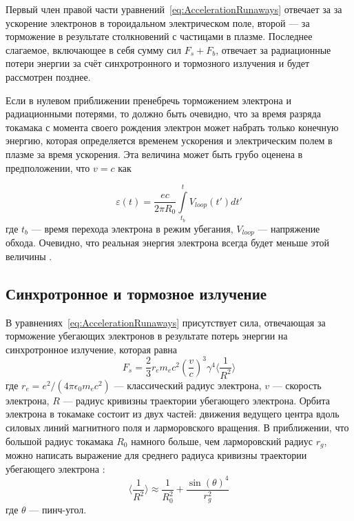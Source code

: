 Первый член правой части уравнений~\ref{eq:AccelerationRunaways} отвечает за за ускорение электронов в тороидальном электрическом поле, второй --- за торможение в результате столкновений с частицами в плазме. Последнее слагаемое, включающее в себя сумму сил $F_s + F_b$, отвечает за радиационные потери энергии за счёт синхротронного и тормозного излучения и будет рассмотрен позднее.

Если в нулевом приближении пренебречь торможением электрона и радиационными потерями, то должно быть очевидно, что за время разряда токамака с момента своего рождения электрон может набрать только конечную энергию, которая определяется временем ускорения и электрическим полем в плазме за время ускорения. Эта величина может быть грубо оценена в предположении, что $v = c$ как

\begin{equation*}
  \varepsilon(t) = \frac{ e c }{ 2 \pi R_0 } \int \limits_{t_b}^{t} V_{loop}(t') d t'
\end{equation*}
где $t_b$ --- время перехода электрона в режим убегания, $V_{loop}$ --- напряжение обхода. Очевидно, что реальная энергия электрона всегда будет меньше этой величины \cite{Shevelev2019th}.


\subsection{Синхротронное и тормозное излучение}

В уравнениях~\ref{eq:AccelerationRunaways} присутствует сила, отвечающая за торможение убегающих электронов в результате потерь энергии на синхротронное излучение, которая равна \cite{MartinSolis1998, MartinSolis1999} 
\begin{equation*}
  F_s = \frac{2}{3} r_e m_e c^2 \left( \frac{v}{c} \right)^3 \gamma^4 \langle \frac{1}{R^2} \rangle
\end{equation*}
где $r_e = e^2/(4 \pi \epsilon_0 m_e c^2 )$ --- классический радиус электрона, $v$ --- скорость электрона, $R$ --- радиус кривизны траектории убегающего электрона. Орбита электрона в токамаке 
состоит из двух частей: движения ведущего центра вдоль силовых линий магнитного поля и ларморовского вращения. В приближении, что большой радиус токамака $R_0$ намного больше, чем ларморовский радиус $r_g$, можно написать выражение для среднего радиуса кривизны траектории убегающего электрона \cite{MartinSolis1998}:
\begin{equation*}
  \langle \frac{1}{R^2} \rangle \approx \frac{1}{R_0^2} + \frac{ \sin(\theta)^4 }{r_g^2}
\end{equation*}
где $\theta$ --- пинч-угол. 

